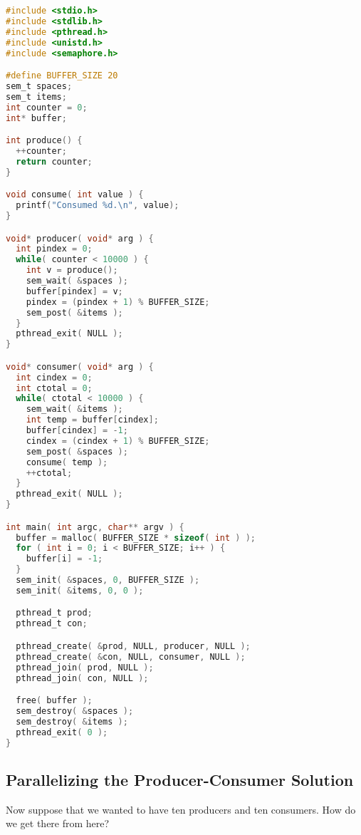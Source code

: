 \begin{lstlisting}[language=C]
#include <stdio.h>
#include <stdlib.h>
#include <pthread.h>
#include <unistd.h>
#include <semaphore.h>

#define BUFFER_SIZE 20
sem_t spaces;
sem_t items;
int counter = 0;
int* buffer;

int produce() {
  ++counter;
  return counter;
} 

void consume( int value ) {
  printf("Consumed %d.\n", value);
}

void* producer( void* arg ) {
  int pindex = 0;
  while( counter < 10000 ) {
    int v = produce();
    sem_wait( &spaces );
    buffer[pindex] = v;
    pindex = (pindex + 1) % BUFFER_SIZE;
    sem_post( &items );
  }
  pthread_exit( NULL );
}

void* consumer( void* arg ) {
  int cindex = 0;
  int ctotal = 0;
  while( ctotal < 10000 ) {
    sem_wait( &items );
    int temp = buffer[cindex];
    buffer[cindex] = -1;
    cindex = (cindex + 1) % BUFFER_SIZE;
    sem_post( &spaces );
    consume( temp );
    ++ctotal;
  }
  pthread_exit( NULL );
}

int main( int argc, char** argv ) {
  buffer = malloc( BUFFER_SIZE * sizeof( int ) );
  for ( int i = 0; i < BUFFER_SIZE; i++ ) {
    buffer[i] = -1;
  }  
  sem_init( &spaces, 0, BUFFER_SIZE );
  sem_init( &items, 0, 0 );

  pthread_t prod;
  pthread_t con;

  pthread_create( &prod, NULL, producer, NULL );
  pthread_create( &con, NULL, consumer, NULL );
  pthread_join( prod, NULL );
  pthread_join( con, NULL );

  free( buffer );
  sem_destroy( &spaces );
  sem_destroy( &items );
  pthread_exit( 0 );
}
\end{lstlisting}


\subsection*{Parallelizing the Producer-Consumer Solution}
Now suppose that we wanted to have ten producers and ten consumers. How do we get there from here?

